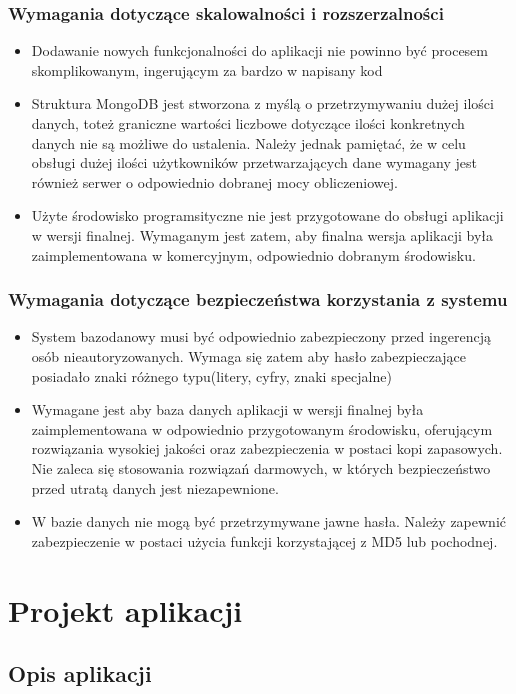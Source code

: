 \documentclass[eng,printmode]{mgr}
\begin{document}
\subsection{Wymagania dotyczące skalowalności i rozszerzalności}
\begin{itemize}
  \item Dodawanie nowych funkcjonalności do aplikacji nie powinno być procesem skomplikowanym, ingerującym za bardzo w napisany kod
  \item Struktura MongoDB jest stworzona z myślą o przetrzymywaniu dużej ilości danych, toteż graniczne wartości liczbowe dotyczące ilości konkretnych danych nie są możliwe do ustalenia. Należy jednak pamiętać, że w celu obsługi dużej ilości użytkowników przetwarzających dane wymagany jest również serwer o odpowiednio dobranej mocy obliczeniowej.
  \item Użyte środowisko programsityczne nie jest przygotowane do obsługi aplikacji w wersji finalnej. Wymaganym jest zatem, aby finalna wersja aplikacji była zaimplementowana w komercyjnym, odpowiednio dobranym środowisku.
\end{itemize}
\subsection{Wymagania dotyczące bezpieczeństwa korzystania z systemu}
\begin{itemize}
  \item System bazodanowy musi być odpowiednio zabezpieczony przed ingerencją osób nieautoryzowanych. Wymaga się zatem aby hasło zabezpieczające posiadało znaki różnego typu(litery, cyfry, znaki specjalne)
  \item Wymagane jest aby baza danych aplikacji w wersji finalnej była zaimplementowana w odpowiednio przygotowanym środowisku, oferującym rozwiązania wysokiej jakości oraz zabezpieczenia w postaci kopi zapasowych. Nie zaleca się stosowania rozwiązań darmowych, w których bezpieczeństwo przed utratą danych jest niezapewnione.
  \item W bazie danych nie mogą być przetrzymywane jawne hasła. Należy zapewnić zabezpieczenie w postaci użycia funkcji korzystającej z MD5\cite{MD5} lub pochodnej.
\end{itemize}
\chapter{Projekt aplikacji}
\section{Opis aplikacji}
\end{document}
